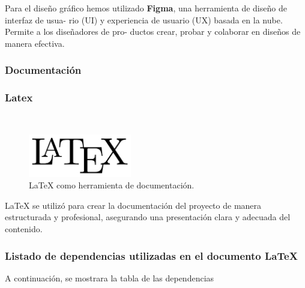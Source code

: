 \documentclass{article}
\begin{document}
\begin{flushleft}
Para el diseño gráfico hemos utilizado \textbf{Figma}, una herramienta de diseño de interfaz de usua-
rio (UI) y experiencia de usuario (UX) basada en la nube. Permite a los diseñadores de pro-
ductos crear, probar y colaborar en diseños de manera efectiva.\\


\subsubsection{Documentación}

\subsubsection*{Latex}\\


\begin{figure}[H]
    \centering
    \includegraphics[width=0.4\textwidth]{TFG/img/LATEX.png}
    \caption{LaTeX como herramienta de documentación.}
    \label{fig:latex}
\end{figure}



    LaTeX se utilizó para crear la documentación del proyecto de manera estructurada y profesional, asegurando una presentación clara y adecuada del contenido.



\subsubsection*{Listado de dependencias utilizadas en el documento LaTeX}
A continuación, se mostrara la tabla de  las dependencias 



\end{flushleft}
\end{document}

